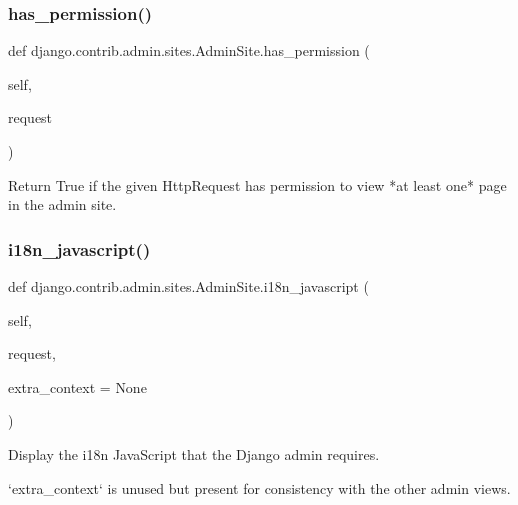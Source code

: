 \subsubsection{\texorpdfstring{has\+\_\+permission()}{has\_permission()}}
{\footnotesize\ttfamily def django.\+contrib.\+admin.\+sites.\+Admin\+Site.\+has\+\_\+permission (\begin{DoxyParamCaption}\item[{}]{self,  }\item[{}]{request }\end{DoxyParamCaption})}

\begin{DoxyVerb}Return True if the given HttpRequest has permission to view
*at least one* page in the admin site.
\end{DoxyVerb}
 \mbox{\label{classdjango_1_1contrib_1_1admin_1_1sites_1_1_admin_site_ab5e74c0d0b6714222e00d6e5897a1543}} 
\subsubsection{\texorpdfstring{i18n\+\_\+javascript()}{i18n\_javascript()}}
{\footnotesize\ttfamily def django.\+contrib.\+admin.\+sites.\+Admin\+Site.\+i18n\+\_\+javascript (\begin{DoxyParamCaption}\item[{}]{self,  }\item[{}]{request,  }\item[{}]{extra\+\_\+context = {\ttfamily None} }\end{DoxyParamCaption})}

\begin{DoxyVerb}Display the i18n JavaScript that the Django admin requires.

`extra_context` is unused but present for consistency with the other
admin views.
\end{DoxyVerb}
 \mbox{\label{classdjango_1_1contrib_1_1admin_1_1sites_1_1_admin_site_a114200436dcab5d292516d7454298630}} 
